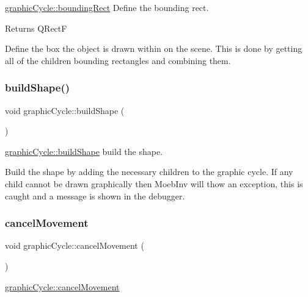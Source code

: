 \mbox{\hyperlink{classgraphic_cycle_a4db310e0fdbccffefc7404c47eb73607}{graphic\+Cycle\+::bounding\+Rect}} Define the bounding rect. 

\begin{DoxyReturn}{Returns}
Q\+RectF
\end{DoxyReturn}
Define the box the object is drawn within on the scene. This is done by getting all of the children bounding rectangles and combining them. \mbox{\label{classgraphic_cycle_ac3a007a95334380db1bcd9b8082cb36c}} 
\subsubsection{\texorpdfstring{build\+Shape()}{buildShape()}}
{\footnotesize\ttfamily void graphic\+Cycle\+::build\+Shape (\begin{DoxyParamCaption}{ }\end{DoxyParamCaption})}



\mbox{\hyperlink{classgraphic_cycle_ac3a007a95334380db1bcd9b8082cb36c}{graphic\+Cycle\+::build\+Shape}} build the shape. 

Build the shape by adding the necessary children to the graphic cycle. If any child cannot be drawn graphically then Moeb\+Inv will thow an exception, this is caught and a message is shown in the debugger. \mbox{\label{classgraphic_cycle_af79bfc4ed813bab595a2a721475a7199}} 
\subsubsection{\texorpdfstring{cancel\+Movement}{cancelMovement}}
{\footnotesize\ttfamily void graphic\+Cycle\+::cancel\+Movement (\begin{DoxyParamCaption}{ }\end{DoxyParamCaption})\hspace{0.3cm}{\ttfamily [slot]}}



\mbox{\hyperlink{classgraphic_cycle_af79bfc4ed813bab595a2a721475a7199}{graphic\+Cycle\+::cancel\+Movement}} 

